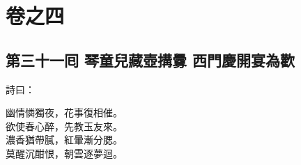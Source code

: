 \part*{{\titlename}卷之四}



\chapter*{第三十一囘 琴童兒藏壺搆釁 西門慶開宴為歡}


詩曰：

\begin{myquote}
幽情憐獨夜，花事復相催。\\欲使春心醉，先教玉友來。\\濃香猶帶膩，紅暈漸分腮。\\莫醒沉酣恨，朝雲逐夢迴。
\end{myquote}

